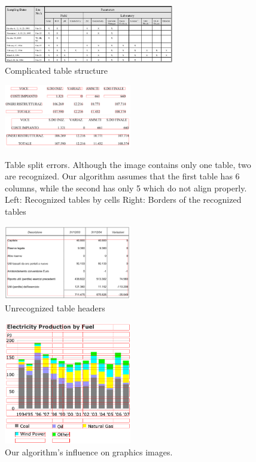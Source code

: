 \begin{figure}[t]
\centering
\includegraphics[width=20em]{img/results/errorStructure.jpg}
\caption{Complicated table structure}
\label{fig:errorTableStructures}
\end{figure}

\begin{figure}[t]
\centering

\includegraphics[width=15em]{img/results/otherErr1Cell.png}
\qquad
\includegraphics[width=15em]{img/results/otherErr1Table.png}

\caption{Table split errors. Although the image contains only one table, two are recognized. Our algorithm assumes that the first table has 6 columns, while the second has only 5 which do not align properly.
Left: Recognized tables by cells Right: Borders of the recognized tables}
\label{fig:errorsOtherSplit}
\end{figure}

\begin{figure}[t]
\centering
\includegraphics[width=15em]{img/results/otherErr2.png}
\caption{Unrecognized table headers}
\label{fig:errorsOtherHeaders}
\end{figure}

\begin{figure}[t]
\centering
\includegraphics[width=15em]{img/results/otherErr3.png}
\caption{Our algorithm's influence on graphics images.}
\label{fig:errorsOtherGraphics}
\end{figure}


